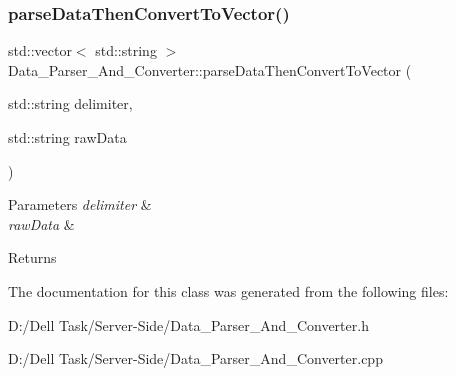 \subsubsection{\texorpdfstring{parse\+Data\+Then\+Convert\+To\+Vector()}{parseDataThenConvertToVector()}}
{\footnotesize\ttfamily std\+::vector$<$ std\+::string $>$ Data\+\_\+\+Parser\+\_\+\+And\+\_\+\+Converter\+::parse\+Data\+Then\+Convert\+To\+Vector (\begin{DoxyParamCaption}\item[{std\+::string}]{delimiter,  }\item[{std\+::string}]{raw\+Data }\end{DoxyParamCaption})\hspace{0.3cm}{\ttfamily [static]}}






\begin{DoxyParams}{Parameters}
{\em delimiter} & \\
\hline
{\em raw\+Data} & \\
\hline
\end{DoxyParams}
\begin{DoxyReturn}{Returns}

\end{DoxyReturn}


The documentation for this class was generated from the following files\+:\begin{DoxyCompactItemize}
\item 
D\+:/\+Dell Task/\+Server-\/\+Side/Data\+\_\+\+Parser\+\_\+\+And\+\_\+\+Converter.\+h\item 
D\+:/\+Dell Task/\+Server-\/\+Side/Data\+\_\+\+Parser\+\_\+\+And\+\_\+\+Converter.\+cpp\end{DoxyCompactItemize}
